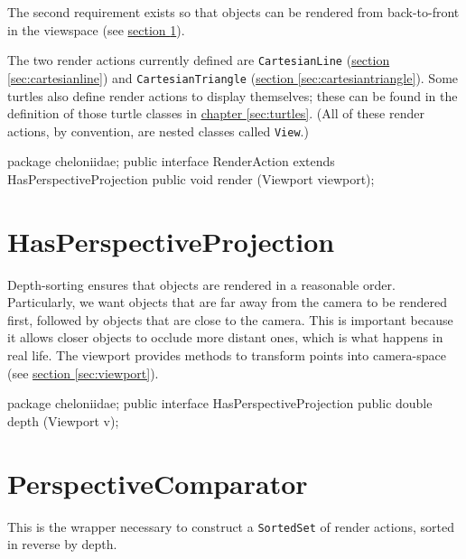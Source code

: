 \documentclass{report}
\newcommand{\Ref}[2]{\hyperref[#2]{#1 \ref*{#2}}}
\begin{document}
      The second requirement exists so that objects can be rendered from back-to-front in the viewspace (see \Ref{section}{sec:hasperspectiveprojection}).

      The two render actions currently defined are {\tt CartesianLine} (\Ref{section}{sec:cartesianline}) and {\tt CartesianTriangle}
      (\Ref{section}{sec:cartesiantriangle}). Some turtles also define render actions to display themselves; these can be found in the definition of those
      turtle classes in \Ref{chapter}{sec:turtles}. (All of these render actions, by convention, are nested classes called {\tt View}.)

\begin{javacode}
package cheloniidae;
public interface RenderAction extends HasPerspectiveProjection {
  public void render (Viewport viewport);
}
\end{javacode}

\section {HasPerspectiveProjection} \label{sec:hasperspectiveprojection}
      Depth-sorting ensures that objects are rendered in a reasonable order. Particularly, we want objects that are far away from the camera to be rendered
      first, followed by objects that are close to the camera. This is important because it allows closer objects to occlude more distant ones, which is what
      happens in real life. The viewport provides methods to transform points into camera-space (see \Ref{section}{sec:viewport}).

\begin{javacode}
package cheloniidae;
public interface HasPerspectiveProjection {
  public double depth (Viewport v);
}
\end{javacode}

\section {PerspectiveComparator} \label{sec:perspectivecomparator}
      This is the wrapper necessary to construct a {\tt SortedSet} of render actions, sorted in reverse by depth.
\end{document}
